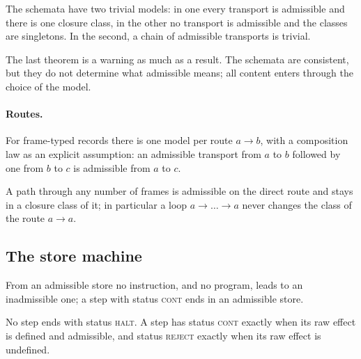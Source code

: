 \begin{theorem}
The schemata have two trivial models: in one every transport is admissible and there is one closure class, in the other no transport is
admissible and the classes are singletons.  In the second, a chain of admissible transports is trivial.
\end{theorem}

The last theorem is a warning as much as a result.  The schemata are consistent, but they do not determine what admissible means; all
content enters through the choice of the model.

\paragraph{Routes.}  For frame-typed records there is one model per route \(a\to b\), with a composition law as an explicit assumption: an
admissible transport from \(a\) to \(b\) followed by one from \(b\) to \(c\) is admissible from \(a\) to \(c\).

\begin{theorem}
A path through any number of frames is admissible on the direct route and stays in a closure class of it; in particular a loop
\(a\to\dots\to a\) never changes the class of the route \(a\to a\).
\end{theorem}

\subsection{The store machine}

\begin{theorem}
From an admissible store no instruction, and no program, leads to an inadmissible one; a step with status \textsc{cont} ends in an admissible
store.
\end{theorem}

\begin{theorem}
No step ends with status \textsc{halt}.  A step has status \textsc{cont} exactly when its raw effect is defined and admissible, and status
\textsc{reject} exactly when its raw effect is undefined.
\end{theorem}

